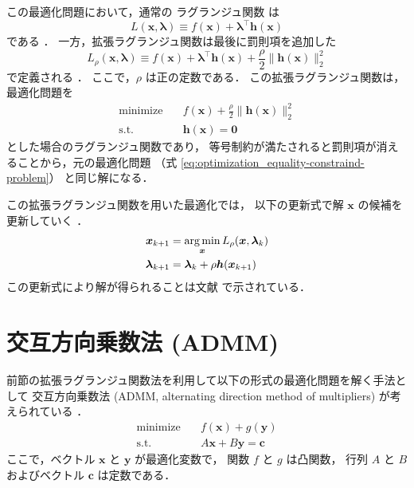 この最適化問題において，通常の
ラグランジュ関数
は
\begin{equation}
    L(\bm{x}, \bm{\lambda}) \equiv f(\bm{x}) + \bm{\lambda}^\top \bm{h}(\bm{x})
\end{equation}
である \cite{Boyd2010, Hisano2012}．
一方，拡張ラグランジュ関数は最後に罰則項を追加した
\begin{equation}
    L_{\rho}(\bm{x}, \bm{\lambda}) \equiv f(\bm{x}) + \bm{\lambda}^\top \bm{h}(\bm{x})
    + \frac{\rho}{2}\|\bm{h}(\bm{x})\|_2^2
\end{equation}
で定義される \cite{Boyd2010, Hisano2012}．
ここで，$\rho$ は正の定数である．
この拡張ラグランジュ関数は，最適化問題を
\begin{equation}
    \begin{aligned}
        \text{minimize} \hspace{1em} & f(\bm{x})  + \frac{\rho}{2}\|\bm{h}(\bm{x})\|_2^2 \\
        \text{s.t.} \hspace{1em}     & \bm{h}(\bm{x}) = \bm{0}
    \end{aligned}
\end{equation}
とした場合のラグランジュ関数であり，
等号制約が満たされると罰則項が消えることから，元の最適化問題
（式 \eqref{eq:optimization_equality-constraind-problem}）
と同じ解になる．

この拡張ラグランジュ関数を用いた最適化では，
以下の更新式で解 $\bm{x}$ の候補を更新していく \cite{Boyd2010, Hisano2012}．
\begin{align}
    \bm{x}_{k+1}       & = \operatorname*{arg \thinspace min}_{\bm{x}} L_{\rho}(\bm{x}, \bm{\lambda}_{k}) \\
    \bm{\lambda}_{k+1} & = \bm{\lambda}_k + \rho \bm{h}(\bm{x}_{k+1})
\end{align}
この更新式により解が得られることは文献 \cite{Ito2008} で示されている．

\section{交互方向乗数法 (ADMM)}\label{sec:optimization_admm}

前節の拡張ラグランジュ関数法を利用して以下の形式の最適化問題を解く手法として
交互方向乗数法 (ADMM, alternating direction method of multipliers)
が考えられている \cite{Boyd2010, Hisano2012}．
\begin{equation}
    \begin{aligned}
        \text{minimize} \hspace{1em} & f(\bm{x}) + g(\bm{y})        \\
        \text{s.t.} \hspace{1em}     & A \bm{x} + B \bm{y} = \bm{c}
    \end{aligned}
\end{equation}
ここで，ベクトル $\bm{x}$ と $\bm{y}$ が最適化変数で，
関数 $f$ と $g$ は凸関数，
行列 $A$ と $B$ およびベクトル $\bm{c}$ は定数である．

